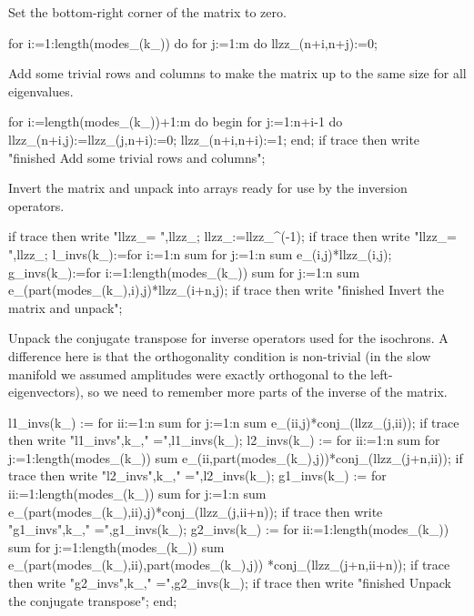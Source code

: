 \documentclass[11pt,a5paper]{article}
\begin{document}
Set the bottom-right corner of the matrix to zero.
\begin{reduce}
  for i:=1:length(modes_(k_)) do 
    for j:=1:m do llzz_(n+i,n+j):=0;
\end{reduce}

Add some trivial rows and columns to make the matrix up to
the same size for all eigenvalues.
\begin{reduce}
  for i:=length(modes_(k_))+1:m do begin 
    for j:=1:n+i-1 do llzz_(n+i,j):=llzz_(j,n+i):=0;
    llzz_(n+i,n+i):=1;
  end;
  if trace then write 
  "finished Add some trivial rows and columns";
\end{reduce}

Invert the matrix and unpack into arrays ready for use by
the inversion operators.
\begin{reduce}
  if trace then write "llzz_= ",llzz_; 
  llzz_:=llzz_^(-1);
  if trace then write "llzz_= ",llzz_;
  l_invs(k_):=for i:=1:n sum for j:=1:n sum e_(i,j)*llzz_(i,j);
  g_invs(k_):=for i:=1:length(modes_(k_)) sum 
    for j:=1:n sum e_(part(modes_(k_),i),j)*llzz_(i+n,j);
  if trace then write "finished Invert the matrix and unpack";
\end{reduce}

Unpack the conjugate transpose for inverse operators used
for the isochrons. A difference here is that the
orthogonality condition is non-trivial (in the slow manifold
we assumed amplitudes were exactly orthogonal to the
left-eigenvectors), so we need to remember more parts of the
inverse of the matrix.  
\begin{reduce}
  l1_invs(k_) := for ii:=1:n sum for j:=1:n sum 
      e_(ii,j)*conj_(llzz_(j,ii));
  if trace then write "l1_invs",k_," =",l1_invs(k_);
  l2_invs(k_) := for ii:=1:n sum 
      for j:=1:length(modes_(k_)) sum 
          e_(ii,part(modes_(k_),j))*conj_(llzz_(j+n,ii));
  if trace then write "l2_invs",k_," =",l2_invs(k_);
  g1_invs(k_) := for ii:=1:length(modes_(k_)) sum 
      for j:=1:n sum 
          e_(part(modes_(k_),ii),j)*conj_(llzz_(j,ii+n));
  if trace then write "g1_invs",k_," =",g1_invs(k_);
  g2_invs(k_) := for ii:=1:length(modes_(k_)) sum 
      for j:=1:length(modes_(k_)) sum 
          e_(part(modes_(k_),ii),part(modes_(k_),j))
          *conj_(llzz_(j+n,ii+n));
  if trace then write "g2_invs",k_," =",g2_invs(k_);
  if trace then write 
  "finished Unpack the conjugate transpose";
end;
\end{reduce}
\end{document}
